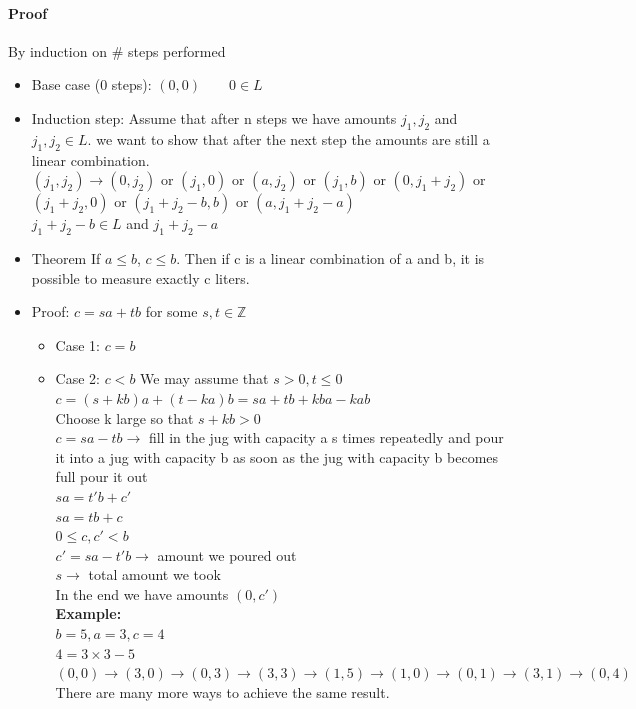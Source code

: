 \documentclass[9pt, letterpaper, oneside]{article}
\begin{document}
\paragraph{Proof}
By induction on \# steps performed
\begin{itemize}
	\item Base case (0 steps): $(0,0) \qquad 0 \in L$
	\item Induction step: Assume that after n steps we have amounts $j_1, j_2$ and $j_1, j_2 \in L$. we want to show that after the next step the amounts are still a linear combination.\\
	$(j_1, j_2) \to (0, j_2)$ or $(j_1, 0)$ or $(a, j_2)$ or $(j_1, b)$ or $(0, j_1 + j_2)$ or $(j_1 + j_2, 0)$ or $(j_1 + j_2 - b, b)$ or $(a, j_1 + j_2 -a)$\\
	$j_1 + j_2 - b \in L$ and $j_1 + j_2 - a$
	\item Theorem If $a \leq b$, $c \leq b$. Then if c is a linear combination of a and b, it is possible to measure exactly c liters.
	\item Proof: $c = sa + tb$ for some $s, t \in \mathbb{Z}$
	\begin{itemize}
		\item Case 1: $c = b$
		\item Case 2: $c < b$ We may assume that $s > 0, t \leq 0$\\
			  $c = (s + kb)a + (t - ka)b = sa + tb + kba - kab$\\
              Choose k large so that $s + kb > 0$\\
              $c = sa -tb \to$ fill in the jug with capacity a s times repeatedly and pour it into a jug with capacity b as soon as the jug with capacity b becomes full pour it out\\
              $sa = t'b + c'$\\
              $sa = tb + c$\\
              $0 \leq c, c' <b$\\
              $c' = sa - t'b \to$ amount we poured out \\
              $s \to$ total amount we took\\
              In the end we have amounts $(0, c')$\\
              \textbf{Example:}\\
              $b = 5, a = 3, c = 4$\\
              $4 = 3 \times 3 - 5$\\
	          $(0,0) \to (3,0) \to (0,3) \to (3,3) \to (1,5) \to (1,0) \to (0,1) \to (3,1) \to (0,4)$\\
              There are many more ways to achieve the same result.
        \end{itemize}
\end{itemize}
\end{document}
